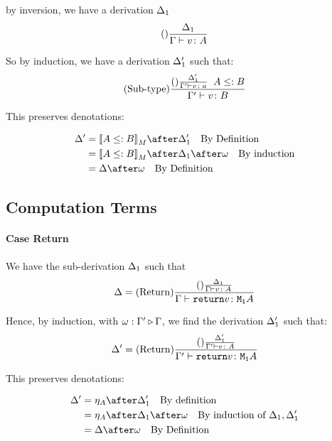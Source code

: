 {    by inversion, we have a derivation $\Delta_1$
    \begin{equation}
        (\text{}) \frac{\Delta_1}{\Gamma \vdash v \colon A}
    \end{equation}

    So by induction, we have a derivation $\Delta_1'$ such that:
    \begin{equation}
        (\text{Sub-type}) \frac{(\text{}) \frac{\Delta_1'}{\Gamma' \vdash v \colon a}\;\; A \leq: B}{\Gamma' \vdash v \colon B}
    \end{equation}

    This preserves denotations:

    \begin{align}
        \D' & = \deno{A\subtype B}\after \D_1' \qt{By Definition} \\
        & = \deno{A\subtype B}\after \D_1\after\w \qt{By induction}\\
        & = \D\after\w \qt{By Definition}\\
    \end{align}

    \subsection{Computation Terms}
    \paragraph{Case Return}
    We have the sub-derivation $\Delta_1$ such that
    \begin{equation}
        \Delta = (\text{Return}) \frac{(\text{}) \frac{\Delta_1}{\Gamma \vdash v \colon A}}{\Gamma \vdash \texttt{return} v \colon \texttt{M}_{\texttt{1}}{A}}
    \end{equation}

    Hence, by induction, with $\omega : \Gamma' \triangleright \Gamma$, we find the derivation $\Delta_1'$ such that:
    \begin{equation}
        \Delta' = (\text{Return}) \frac{(\text{}) \frac{\Delta_1'}{\Gamma' \vdash v \colon A}}{\Gamma' \vdash \texttt{return} v \colon \texttt{M}_{\texttt{1}}{A}}
    \end{equation}

    This preserves denotations:

    \begin{align}
        \D' & = \point{A}\after\D_1' \qt{By definition}\\
            & = \point{A}\after\D_1\after\w\qt{By induction of $\D_1, \D_1'$}\\
            & = \D\after\w\qt{By Definition}
    \end{align}

}
